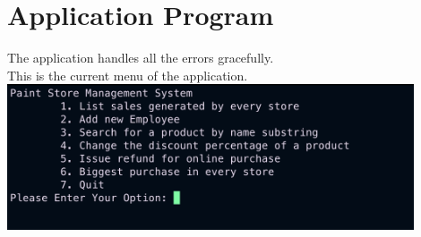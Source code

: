 \documentclass[a4paper,11pt]{article}
\begin{document}
\section*{Application Program}
The application handles all the errors gracefully.\\
This is the current menu of the application.\\
\includegraphics[width=0.9\textwidth]{images/menu.png}
\end{document}
